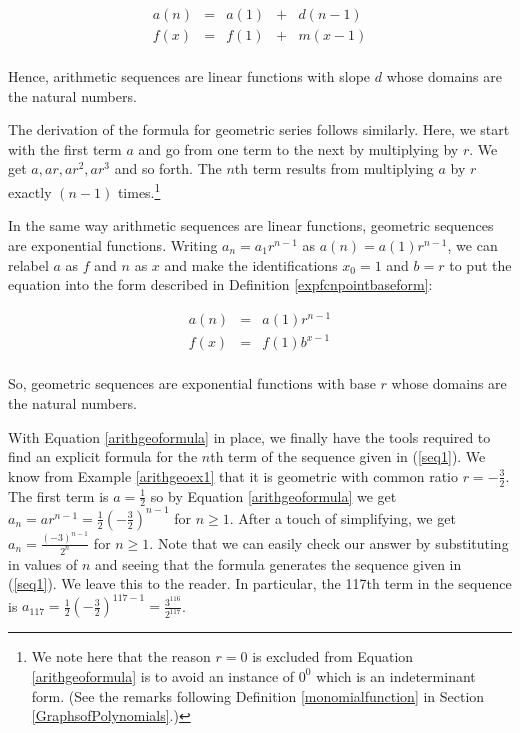 \[ \begin{array}{ccccc}
a(n) & = & a(1) & + & d (n-1) \\
 f(x) & = & f(1) & + & m (x-1) \\ \end{array} \]


Hence,  arithmetic sequences are linear functions with slope $d$ whose domains are the natural numbers.


The derivation of the formula for geometric series follows similarly.  Here, we start with the first term $a$ and go from one term to the next by multiplying by $r$.  We get $a, ar, ar^2, ar^3$ and so forth.  The $n$th term results from multiplying $a$ by $r$ exactly $(n-1)$ times.\footnote{We note here that the reason $r=0$ is excluded from Equation \ref{arithgeoformula} is to avoid an instance of $0^{0}$ which is an indeterminant form. (See the remarks following Definition \ref{monomialfunction} in Section \ref{GraphsofPolynomials}.)} 

In the same way  arithmetic sequences are linear functions, geometric sequences are exponential functions.  Writing  $a_{n} = a_{1} r^{n-1}$ as $a(n) = a(1) r^{n-1}$,  we can relabel $a$ as $f$ and $n$ as $x$ and make the identifications $x_{0} = 1$ and $b = r$ to put the equation into the form described in  Definition \ref{expfcnpointbaseform}:

\[ \begin{array}{ccc}
a(n) & = & a(1) r^{n-1} \\
 f(x) & = & f(1) b^{x-1} \\ \end{array} \]

So, geometric sequences are exponential functions with base $r$ whose domains are the natural numbers.

With Equation \ref{arithgeoformula} in place, we finally have the tools required to find an explicit formula for the $n$th term of the sequence given in (\ref{seq1}). We know from Example \ref{arithgeoex1} that it is geometric with common ratio $r = -\frac{3}{2}$.  The first term is $a = \frac{1}{2}$ so by Equation \ref{arithgeoformula} we get $a_{n} = ar^{n-1} = \frac{1}{2} \left( - \frac{3}{2}\right)^{n-1}$ for $n \geq 1$.  After a touch of simplifying, we get $a_{n} = \frac{(-3)^{n-1}}{2^{n}}$ for $n \geq 1$. Note that we can easily check our answer by substituting in values of $n$ and seeing that the formula generates the sequence given in (\ref{seq1}).  We leave this to the reader.  In particular, the 117th term in the sequence is $a_{117} = \frac{1}{2} \left(-\frac{3}{2} \right)^{117-1} = \frac{3^{116}}{2^{117}}$.

